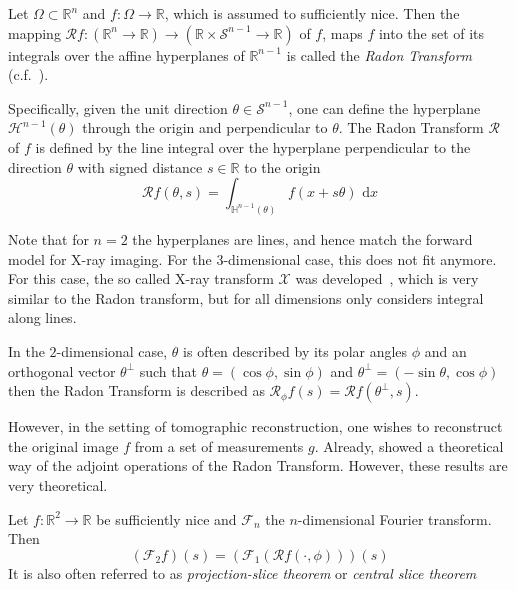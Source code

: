 \begin{definition}
	Let \(\Omega \subset \mathbb{R}^n\) and \(f\colon \Omega \to \mathbb{R}\), which is assumed
	to sufficiently nice. Then the mapping \(\mathscr{R}f\colon (\mathbb{R}^n \to \mathbb{R})
	\to (\mathbb{R} \times \mathscr{S}^{n-1} \to \mathbb{R})\) of \(f\), maps \(f\) into the set
	of its integrals over the affine hyperplanes of \(\mathbb{R}^{n-1}\) is called the
	\textit{Radon Transform} (c.f.~\cite{natterer_mathematics_1986,buzug_computed_2008}).

	Specifically, given the unit direction \(\theta \in \mathscr{S}^{n-1}\), one can define the
	hyperplane \(\mathscr{H}^{n-1}(\theta)\) through the origin and perpendicular to \(\theta\).
	The Radon Transform \(\mathscr{R}\) of \(f\) is defined by the line integral over the
	hyperplane perpendicular to the direction \(\theta\) with signed distance \(s \in
	\mathbb{R}\) to the origin
	\[ \mathscr{R}f(\theta, s) = \int_{\mathbb{H}^{n-1}(\theta)} f(x + s\theta) \, \, \mathrm{d}x \]
\end{definition}

Note that for \(n=2\) the hyperplanes are lines, and hence match the forward model for X-ray
imaging. For the 3-dimensional case, this does not fit anymore. For this case, the so called X-ray
transform \(\mathscr{X}\) was developed~\cite{solmon_x-ray_1976}, which is very similar to the Radon
transform, but for all dimensions only considers integral along lines.

In the \(2\)-dimensional case, \(\theta\) is often described by its polar angles \(\phi\) and an
orthogonal vector \(\theta^\perp\) such that
\( \theta = (\cos \phi, \sin \phi)\) and \(\theta^\perp = (-\sin\theta, \cos\phi)\)
then the Radon Transform is described as \( \mathscr{R}_\phi f(s) =\mathscr{R}f(\theta^\perp, s)\).

However, in the setting of tomographic reconstruction, one wishes to reconstruct the original image
\(f\) from a set of measurements \(g\). Already, \citeauthor*{radon_uber_1917} showed a theoretical
way of the adjoint operations of the Radon Transform. However, these results are very theoretical.

\begin{definition}\label{def:fourier_slice_theorem}
	Let \(f\colon \mathbb{R}^2 \to \mathbb{R}\) be sufficiently nice and \(\mathscr{F}_n\) the
	\(n\)-dimensional Fourier transform. Then
	\[ (\mathscr{F}_2f)(s) = (\mathscr{F}_1(\mathscr{R}f(\cdot, \phi)))(s) \]
	It is also often referred to as \textit{projection-slice theorem} or \textit{central slice theorem}
\end{definition}

